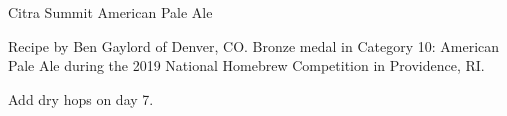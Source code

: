 \begin{recipe}{Citra Summit American Pale Ale} %

\begin{aboutblock}
Recipe by Ben Gaylord of Denver, CO. Bronze medal in Category 10: American Pale
Ale during the 2019 National Homebrew Competition in Providence, RI.
\sourceaha
\end{aboutblock}


\begin{methodandtiming}
 
\begin{mashsteps}
\end{mashsteps}

\begin{fermentationsteps}
\end{fermentationsteps}

\begin{directions}
Add dry hops on day 7.
\end{directions}

\end{methodandtiming}

\recipebreak

\begin{ingredientsblock}

\begin{malts}
\end{malts}

\begin{hops}
\end{hops}


\end{ingredientsblock}

\end{recipe}

